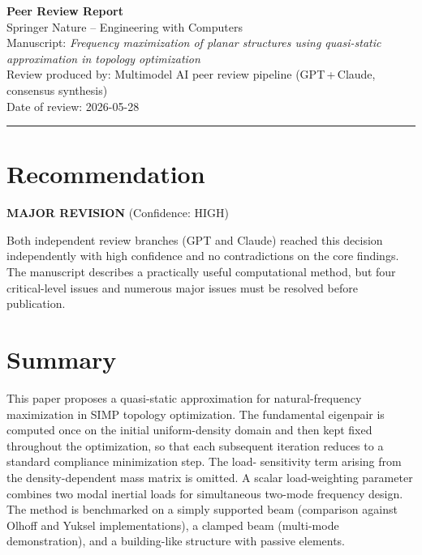 \documentclass[11pt,a4paper]{article}
\begin{document}

\begin{center}
{\Large\bfseries Peer Review Report}\\[6pt]
{\large Springer Nature -- Engineering with Computers}\\[4pt]
{\normalsize Manuscript: \textit{Frequency maximization of planar structures
using quasi-static approximation in topology optimization}}\\[4pt]
{\normalsize Review produced by: Multimodel AI peer review pipeline
(GPT\,+\,Claude, consensus synthesis)\\
Date of review: 2026-05-28}
\end{center}

\bigskip
\hrule
\bigskip


\section*{Recommendation}

\textbf{MAJOR REVISION} \quad (Confidence: HIGH)

Both independent review branches (GPT and Claude) reached this decision independently
with high confidence and no contradictions on the core findings. The manuscript describes
a practically useful computational method, but four critical-level issues and numerous
major issues must be resolved before publication.


\section{Summary}

This paper proposes a quasi-static approximation for natural-frequency maximization in
SIMP topology optimization. The fundamental eigenpair is computed once on the initial
uniform-density domain and then kept fixed throughout the optimization, so that each
subsequent iteration reduces to a standard compliance minimization step. The load-
sensitivity term arising from the density-dependent mass matrix is omitted. A scalar
load-weighting parameter combines two modal inertial loads for simultaneous two-mode
frequency design. The method is benchmarked on a simply supported beam (comparison
against Olhoff and Yuksel implementations), a clamped beam (multi-mode demonstration),
and a building-like structure with passive elements.
\end{document}
